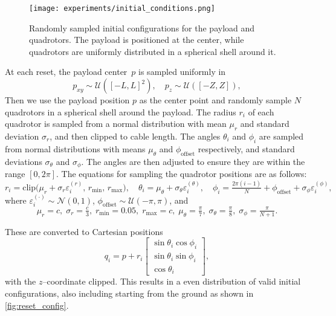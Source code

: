 \begin{figure}
    \centering
    \texttt{[image: experiments/initial\_conditions.png]}
    \caption[Harsh conditions generation]{Randomly sampled initial configurations for the payload and quadrotors. The payload is positioned at the center, while quadrotors are uniformly distributed in a spherical shell around it.}
    \label{fig:reset_config}
\end{figure}
At each reset, the payload center~$p$ is sampled uniformly in
\begin{equation}
p_{xy}\sim\mathcal{U}([-L,L]^2),\quad p_z\sim\mathcal{U}([-Z,Z]),
\end{equation}
Then we use the payload position $p$ as the center point and randomly sample $N$ quadrotors in a spherical shell around the payload. The radius $r_i$ of each quadrotor is sampled from a normal distribution with mean $\mu_r$ and standard deviation $\sigma_r$, and then clipped to cable length. The angles $\theta_i$ and $\phi_i$ are sampled from normal distributions with means $\mu_\theta$ and $\phi_{\mathrm{offset}}$ respectively, and standard deviations $\sigma_\theta$ and $\sigma_\phi$. The angles are then adjusted to ensure they are within the range $[0, 2\pi]$. The equations for sampling the quadrotor positions are as follows:
\begin{equation}
r_i = \mathrm{clip}\bigl(\mu_r+\sigma_r\varepsilon_i^{(r)},\,r_{\min},\,r_{\max}\bigr),\quad
\theta_i = \mu_\theta+\sigma_\theta\varepsilon_i^{(\theta)},\quad
\phi_i = \tfrac{2\pi(i-1)}{N} + \phi_{\mathrm{offset}} + \sigma_\phi\varepsilon_i^{(\phi)},
\end{equation}
where $\varepsilon_i^{(\cdot)}\!\sim\mathcal{N}(0,1)$, $\phi_{\mathrm{offset}}\!\sim\mathcal{U}(-\pi,\pi)$, and
\begin{equation}
\mu_r=c,\;\sigma_r=\tfrac{c}{3},\;r_{\min}=0.05,\;r_{\max}=c,\;
\mu_\theta=\tfrac{\pi}{7},\;\sigma_\theta=\tfrac{\pi}{8},\;\sigma_\phi=\tfrac{\pi}{N+1}.
\end{equation}

These are converted to Cartesian positions
\begin{equation}
q_i = p + r_i
\begin{bmatrix}
\sin\theta_i\cos\phi_i\\
\sin\theta_i\sin\phi_i\\
\cos\theta_i
\end{bmatrix},
\end{equation}
with the $z$–coordinate clipped. 
This results in a even distribution of valid initial configurations, also including starting from the ground as shown in \autoref{fig:reset_config}. 



